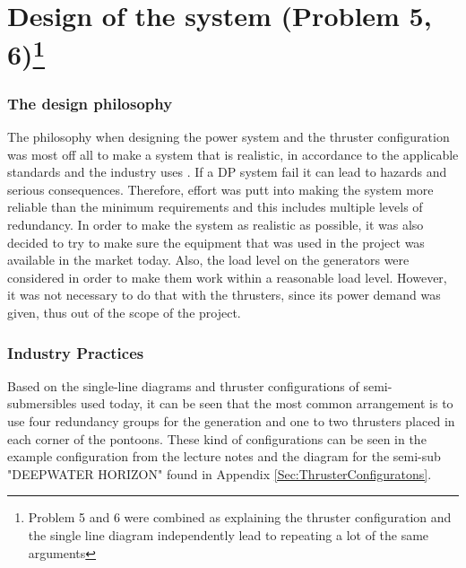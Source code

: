 \newpage
\section*{Design of the system (Problem 5, 6)\footnote{Problem 5 and 6 were combined as explaining the thruster configuration and the single line diagram independently lead to repeating a lot of the same arguments}} \label{prob_5and6}


 \subsubsection*{The design philosophy}\label{Sec:designPhilosophy}
The philosophy when designing the power system and the thruster configuration was most off all to make a system that is realistic, in accordance to the applicable standards and the industry uses . If a DP system fail it can lead to hazards and serious consequences. Therefore, effort was putt into making the system more reliable than the minimum requirements and this includes multiple levels of redundancy. In order to make the system as realistic as possible, it was also decided to try to make sure the equipment that was used in the project was available in the market today. Also, the load level on the generators were considered in order to make them work within a reasonable load level. However, it was not necessary to do that with the thrusters, since its power demand was given, thus out of the scope of the project. 


\subsubsection*{Industry Practices} \label{Sec:industryPractices}
Based on the single-line diagrams and thruster configurations of semi-submersibles used today, it can be seen that the most common arrangement is to use four redundancy groups for the generation and one to two thrusters placed in each corner of the pontoons. These kind of configurations can be seen in the example configuration from the lecture notes and the diagram for the semi-sub "DEEPWATER HORIZON" found in Appendix \ref{Sec:ThrusterConfiguratons}.  

